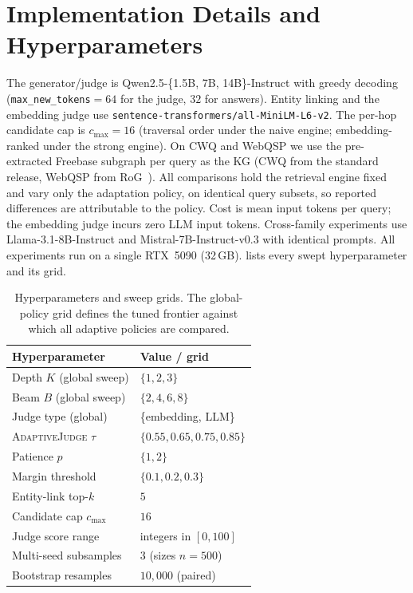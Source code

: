 \section{Implementation Details and Hyperparameters}
\label{app:impl}

The generator/judge is Qwen2.5-\{1.5B, 7B, 14B\}-Instruct with greedy decoding (\texttt{max\_new\_tokens}$=64$ for the judge, $32$ for answers). Entity linking and the embedding judge use \texttt{sentence-transformers/\allowbreak all-MiniLM-L6-v2}. The per-hop candidate cap is $c_{\max}{=}16$ (traversal order under the naive engine; embedding-ranked under the strong engine). On CWQ and WebQSP we use the pre-extracted Freebase subgraph per query as the KG (CWQ from the standard release, WebQSP from RoG~\cite{luo2023reasoning}). All comparisons hold the retrieval engine fixed and vary only the adaptation policy, on identical query subsets, so reported differences are attributable to the policy. Cost is mean input tokens per query; the embedding judge incurs zero LLM input tokens. Cross-family experiments use Llama-3.1-8B-Instruct and Mistral-7B-Instruct-v0.3 with identical prompts. All experiments run on a single RTX~5090 (32\,GB).  lists every swept hyperparameter and its grid.

\begin{table}[t]
\centering
\caption{Hyperparameters and sweep grids. The global-policy grid defines the tuned frontier against which all adaptive policies are compared.}
\label{tab:hparams}
\small
\begin{tabular}{@{}ll@{}}
\toprule
Hyperparameter & Value / grid \\
\midrule
Depth $K$ (global sweep)      & $\{1,2,3\}$ \\
Beam $B$ (global sweep)       & $\{2,4,6,8\}$ \\
Judge type (global)           & \{embedding, LLM\} \\
\textsc{AdaptiveJudge} $\tau$ & $\{0.55, 0.65, 0.75, 0.85\}$ \\
Patience $p$                  & $\{1,2\}$ \\
Margin threshold              & $\{0.1, 0.2, 0.3\}$ \\
Entity-link top-$k$           & $5$ \\
Candidate cap $c_{\max}$      & $16$ \\
Judge score range            & integers in $[0,100]$ \\
Multi-seed subsamples         & $3$ (sizes $n{=}500$) \\
Bootstrap resamples           & $10{,}000$ (paired) \\
\bottomrule
\end{tabular}
\end{table}

